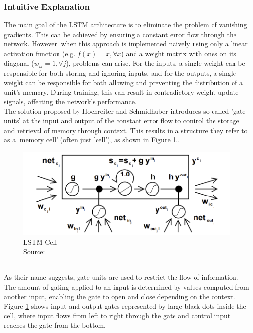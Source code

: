 \documentclass[twoside,a4paper,10pt,DIV=12,BCOR=12mm]{scrartcl}
\begin{document}
\subsubsection{Intuitive Explanation}
The main goal of the LSTM architecture is to eliminate the problem of vanishing gradients. This can be achieved by ensuring a constant error flow through the network. However, when this approach is implemented naively using only a linear activation function (e.g. \begin{math}f(x)=x,\forall x\end{math}) and a weight matrix with ones on its diagonal (\begin{math}w_{jj}=1,\forall j\end{math}), problems can arise. For the inputs, a single weight can be responsible for both storing and ignoring inputs, and for the outputs, a single weight can be responsible for both allowing and preventing the distribution of a unit's memory. During training, this can result in contradictory weight update signals, affecting the network's performance. \cite{hochreiter1997lstm}\\
The solution proposed by Hochreiter and Schmidhuber introduces so-called 'gate units' at the input and output of the constant error flow to control the storage and retrieval of memory through context. This results in a structure they refer to as a 'memory cell' (often just 'cell'), as shown in Figure \ref{fig:lstm-cell}.\cite{hochreiter1997lstm}.
\begin{figure}[h!]
    \centering
    \includegraphics[width=\linewidth]{LSTM-Cell-Diagram.png}
    \caption{LSTM Cell\\ Source: \cite{hochreiter1997lstm}}
    \label{fig:lstm-cell}
\end{figure}
\\As their name suggests, gate units are used to restrict the flow of information.  The amount of gating applied to an input is determined by values computed from another input, enabling the gate to open and close depending on the context. Figure \ref{fig:lstm-cell} shows input and output gates represented by large black dots inside the cell, where input flows from left to right through the gate and control input reaches the gate from the bottom.\cite{hochreiter1997lstm}
\end{document}
